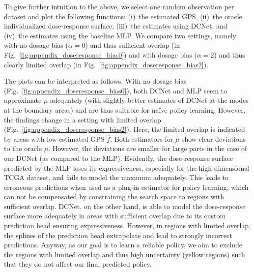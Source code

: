 To give further intuition to the above, we select one random observation per dataset and plot the following functions: (i)~the estimated GPS, (ii)~the oracle individualized dose-response surface, (iii)~the estimates using DCNet, and (iv)~the estimates using the baseline MLP. We compare two settings, namely with no dosage bias ($\alpha=0$) and thus sufficient overlap (in Fig.~\ref{fig:appendix_doseresponse_bias0}) and with dosage bias ($\alpha=2$) and thus clearly limited overlap (in Fig.~\ref{fig:appendix_doseresponse_bias2}). 

The plots can be interpreted as follows. With no dosage bias (Fig.~\ref{fig:appendix_doseresponse_bias0}), both DCNet and MLP seem to approximate $\mu$ adequately (with slightly better estimates of DCNet at the modes at the boundary areas) and are thus suitable for na\"ive policy learning. However, the findings change in a setting with limited overlap (Fig.~\ref{fig:appendix_doseresponse_bias2}). Here, the limited overlap is indicated by areas with low estimated GPS $\hat{f}$. Both estimators for $\hat{\mu}$ show clear deviations to the oracle $\mu$. However, the deviations are smaller for large parts in the case of our DCNet (as compared to the MLP). Evidently, the dose-response surface predicted by the MLP loses its expressiveness, especially for the high-dimensional TCGA dataset, and fails to model the maximum adequately. This leads to erroneous predictions when used as a plug-in estimator for policy learning, which can not be compensated by constraining the search space to regions with sufficient overlap. DCNet, on the other hand, is able to model the dose-response surface more adequately in areas with sufficient overlap due to its custom prediction head ensuring expressiveness. However, in regions with limited overlap, the splines of the prediction head extrapolate and lead to strongly incorrect predictions. Anyway, as our goal is to learn a reliable policy, we aim to exclude the regions with limited overlap and thus high uncertainty (yellow regions) such that they do not affect our final predicted policy.

